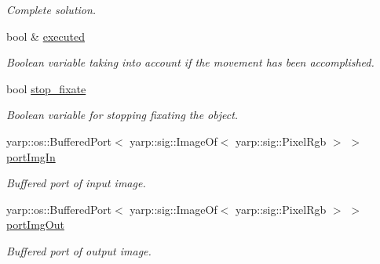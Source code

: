 \begin{DoxyCompactItemize}
\begin{DoxyCompactList}\small\item\em Complete solution. \end{DoxyCompactList}\item 
bool \& \hyperlink{classGraspVisualization_ac1c748f2c0bbb38c4ea19216cb4dbfc8}{executed}\label{classGraspVisualization_ac1c748f2c0bbb38c4ea19216cb4dbfc8}

\begin{DoxyCompactList}\small\item\em Boolean variable taking into account if the movement has been accomplished. \end{DoxyCompactList}\item 
bool \hyperlink{classGraspVisualization_ad26b15866f86df9e9c2ec59658cfdd80}{stop\+\_\+fixate}\label{classGraspVisualization_ad26b15866f86df9e9c2ec59658cfdd80}

\begin{DoxyCompactList}\small\item\em Boolean variable for stopping fixating the object. \end{DoxyCompactList}\item 
yarp\+::os\+::\+Buffered\+Port$<$ yarp\+::sig\+::\+Image\+Of$<$ yarp\+::sig\+::\+Pixel\+Rgb $>$ $>$ \hyperlink{classGraspVisualization_a82ecdc743d9883336682ffd0e6b9c113}{port\+Img\+In}\label{classGraspVisualization_a82ecdc743d9883336682ffd0e6b9c113}

\begin{DoxyCompactList}\small\item\em Buffered port of input image. \end{DoxyCompactList}\item 
yarp\+::os\+::\+Buffered\+Port$<$ yarp\+::sig\+::\+Image\+Of$<$ yarp\+::sig\+::\+Pixel\+Rgb $>$ $>$ \hyperlink{classGraspVisualization_a9d9aab016248eb6eec902fed80e74d65}{port\+Img\+Out}\label{classGraspVisualization_a9d9aab016248eb6eec902fed80e74d65}

\begin{DoxyCompactList}\small\item\em Buffered port of output image. \end{DoxyCompactList}\end{DoxyCompactItemize}
